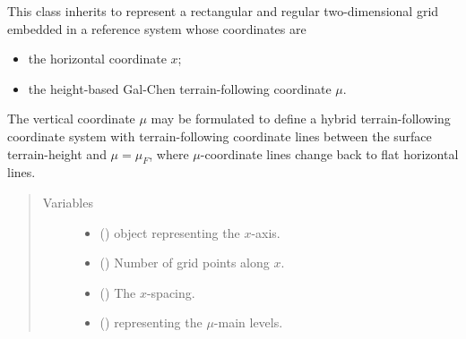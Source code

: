 \documentclass[letterpaper,10pt,english]{sphinxmanual}
\begin{document}
\begin{fulllineitems}
\label{\detokenize{api:tasmania.grids.gal_chen.GalChen2d}}
This class inherits  to represent a rectangular and regular two-dimensional
grid embedded in a reference system whose coordinates are
\begin{itemize}
\item {} 
the horizontal coordinate \(x\);

\item {} 
the height-based Gal-Chen terrain-following coordinate \(\mu\).

\end{itemize}

The vertical coordinate \(\mu\) may be formulated to define a hybrid terrain-following coordinate system
with terrain-following coordinate lines between the surface terrain-height and \(\mu = \mu_F\), where
\(\mu\)-coordinate lines change back to flat horizontal lines.
\begin{quote}\begin{description}
\item[{Variables}] \leavevmode\begin{itemize}
\item {} 
{\hyperref[\detokenize{api:tasmania.grids.grid_xyz.GridXYZ.x}]{}} () \textendash{} {\hyperref[\detokenize{api:tasmania.grids.axis.Axis}]{}} object representing the \(x\)-axis.

\item {} 
{\hyperref[\detokenize{api:tasmania.grids.grid_xyz.GridXYZ.nx}]{}} () \textendash{} Number of grid points along \(x\).

\item {} 
{\hyperref[\detokenize{api:tasmania.grids.grid_xyz.GridXYZ.dx}]{}} () \textendash{} The \(x\)-spacing.

\item {} 
 () \textendash{} {\hyperref[\detokenize{api:tasmania.grids.axis.Axis}]{}} representing the \(\mu\)-main levels.


\end{itemize}
\end{description}
\end{quote}
\end{fulllineitems}
\end{document}
